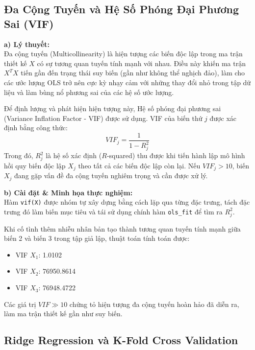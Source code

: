 \documentclass[12pt,a4paper]{article}
\begin{document}
\subsection{Đa Cộng Tuyến và Hệ Số Phóng Đại Phương Sai (VIF)}

\textbf{a) Lý thuyết:} \\
Đa cộng tuyến (Multicollinearity) là hiện tượng các biến độc lập trong ma trận thiết kế $X$ có sự tương quan tuyến tính mạnh với nhau. Điều này khiến ma trận $X^T X$ tiến gần đến trạng thái suy biến (gần như không thể nghịch đảo), làm cho các ước lượng OLS trở nên cực kỳ nhạy cảm với những thay đổi nhỏ trong tập dữ liệu và làm bùng nổ phương sai của các hệ số ước lượng.

Để định lượng và phát hiện hiện tượng này, Hệ số phóng đại phương sai (Variance Inflation Factor - VIF) được sử dụng. VIF của biến thứ $j$ được xác định bằng công thức:
\begin{equation}
    VIF_j = \frac{1}{1 - R_j^2}
\end{equation}
Trong đó, $R_j^2$ là hệ số xác định ($R$-squared) thu được khi tiến hành lập mô hình hồi quy biến độc lập $X_j$ theo tất cả các biến độc lập còn lại. Nếu $VIF_j > 10$, biến $X_j$ đang gặp vấn đề đa cộng tuyến nghiêm trọng và cần được xử lý.

\textbf{b) Cài đặt \& Minh họa thực nghiệm:} \\
Hàm \texttt{vif(X)} được nhóm tự xây dựng bằng cách lặp qua từng đặc trưng, tách đặc trưng đó làm biến mục tiêu và tái sử dụng chính hàm \texttt{ols\_fit} để tìm ra $R_j^2$. 

Khi cố tình thêm nhiễu nhân bản tạo thành tương quan tuyến tính mạnh giữa biến 2 và biến 3 trong tập giả lập, thuật toán tính toán được:
\begin{itemize}
    \item VIF $X_1$: 1.0102
    \item VIF $X_2$: 76950.8614
    \item VIF $X_3$: 76948.4722
\end{itemize}
Các giá trị $VIF \gg 10$ chứng tỏ hiện tượng đa cộng tuyến hoàn hảo đã diễn ra, làm ma trận thiết kế gần như suy biến.

\subsection{Ridge Regression và K-Fold Cross Validation}
\end{document}
